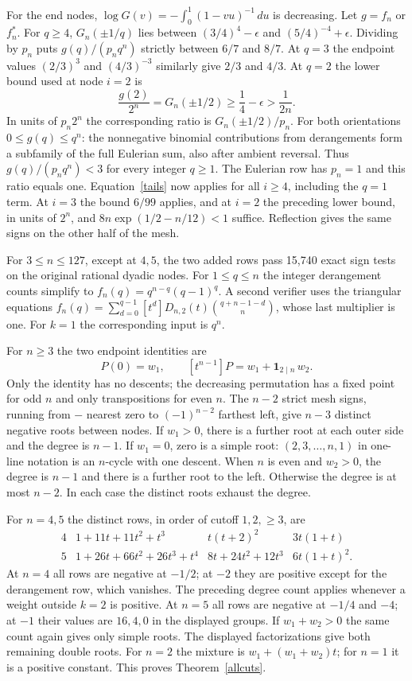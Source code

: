 For the end nodes, $\log G(v)=-\int_0^1(1-vu)^{-1}\,du$ is decreasing.
Let $g=f_n$ or $f_n^*$. For $q\ge4$, $G_n(\pm1/q)$ lies between $(3/4)^4-\epsilon$ and $(5/4)^{-4}+\epsilon$. Dividing by $p_n$ puts $g(q)/(p_nq^n)$ strictly between $6/7$ and $8/7$. At $q=3$ the endpoint values $(2/3)^3$ and $(4/3)^{-3}$ similarly give $2/3$ and $4/3$. At $q=2$ the lower bound used at node $i=2$ is
\[
 \frac{g(2)}{2^n}=G_n(\pm1/2)\ge\frac14-\epsilon>\frac1{2n}.
\]
In units of $p_n2^n$ the corresponding ratio is $G_n(\pm1/2)/p_n$.
For both orientations $0\le g(q)\le q^n$: the nonnegative binomial contributions from derangements form a subfamily of the full Eulerian sum, also after ambient reversal. Thus $g(q)/(p_nq^n)<3$ for every integer $q\ge1$. The Eulerian row has $p_n=1$ and this ratio equals one. Equation~\eqref{tails} now applies for all $i\ge4$, including the $q=1$ term. At $i=3$ the bound $6/99$ applies, and at $i=2$ the preceding lower bound, in units of $2^n$, and $8n\exp(1/2-n/12)<1$ suffice. Reflection gives the same signs on the other half of the mesh.

For $3\le n\le127$, except at $4,5$, the two added rows pass 15,740 exact sign tests on the original rational dyadic nodes. For $1\le q\le n$ the integer derangement counts simplify to $f_n(q)=q^{n-q}(q-1)^q$. A second verifier uses the triangular equations $f_n(q)=\sum_{d=0}^{q-1}[t^d]D_{n,2}(t)\binom{q+n-1-d}{n}$, whose last multiplier is one. For $k=1$ the corresponding input is $q^n$.

For $n\ge3$ the two endpoint identities are
\[
 P(0)=w_1,\qquad [t^{n-1}]P=w_1+\mathbf1_{2\mid n}\,w_2.
\]
Only the identity has no descents; the decreasing permutation has a fixed point for odd $n$ and only transpositions for even $n$.
The $n-2$ strict mesh signs, running from $-$ nearest zero to $(-1)^{n-2}$ farthest left, give $n-3$ distinct negative roots between nodes. If $w_1>0$, there is a further root at each outer side and the degree is $n-1$. If $w_1=0$, zero is a simple root: $(2,3,\ldots,n,1)$ in one-line notation is an $n$-cycle with one descent. When $n$ is even and $w_2>0$, the degree is $n-1$ and there is a further root to the left. Otherwise the degree is at most $n-2$. In each case the distinct roots exhaust the degree.

For $n=4,5$ the distinct rows, in order of cutoff $1,2,\ge3$, are
\[
\begin{array}{c|lll}
4&1+11t+11t^2+t^3&t(t+2)^2&3t(1+t)\\
5&1+26t+66t^2+26t^3+t^4&8t+24t^2+12t^3&6t(1+t)^2 .
\end{array}
\]
At $n=4$ all rows are negative at $-1/2$; at $-2$ they are positive except for the derangement row, which vanishes. The preceding degree count applies whenever a weight outside $k=2$ is positive. At $n=5$ all rows are negative at $-1/4$ and $-4$; at $-1$ their values are $16,4,0$ in the displayed groups. If $w_1+w_2>0$ the same count again gives only simple roots. The displayed factorizations give both remaining double roots. For $n=2$ the mixture is $w_1+(w_1+w_2)t$; for $n=1$ it is a positive constant. This proves Theorem~\ref{allcuts}.
